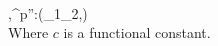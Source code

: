 \\[0.2cm]
	{\Gamma,\Pi\vdash [c\;e_1^{p} \; e_2^{p'}]^{p''}:(\delta_1\cup\delta_2,\emptyset)}\\[0.3cm]
	Where $c$ is a functional constant.
